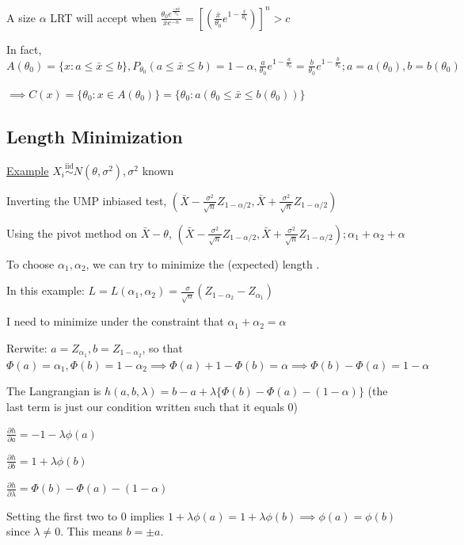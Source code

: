 \documentclass{article}
\newcommand{\iiddist}{\overset{\mathrm{iid}}{\sim}}
\begin{document}
A size $\alpha$ LRT will accept when $\frac{\theta_0 e^{\frac{-n\bar{x}}{\theta_0}}}{\bar{x} e^{-n}} = \left[(\frac{\bar{x}}{\theta_0}e^{1-\frac{\bar{x}}{\theta_0}})\right]^n > c$

In fact, $A(\theta_0) = \{x: a \le \bar{x} \le b\}, P_{\theta_0}(a \le \bar{x} \le b) = 1-\alpha, \frac{a}{\theta_0} e^{1-\frac{a}{\theta_0}} = \frac{b}{\theta_0}e^{1-\frac{b}{\theta_0}}; a = a(\theta_0), b = b(\theta_0)$

$\implies C(x) = \{\theta_0: x \in A(\theta_0)\} = \{\theta_0: a(\theta_0 \le \bar{x} \le b(\theta_0))\}$

\subsection{Length Minimization}

\underline{Example} $X_i \iiddist N(\theta, \sigma^2), \sigma^2$ known

Inverting the UMP inbiased test, $(\bar{X} - \frac{\sigma^2}{\sqrt{n}}Z_{1-\alpha/2}, \bar{X} + \frac{\sigma^2}{\sqrt{n}}Z_{1-\alpha/2})$

Using the pivot method on $\bar{X} - \theta$, $(\bar{X} - \frac{\sigma^2}{\sqrt{n}}Z_{1-\alpha/2}, \bar{X} + \frac{\sigma^2}{\sqrt{n}}Z_{1-\alpha/2}); \alpha_1 + \alpha_2 + \alpha$

To choose $\alpha_1, \alpha_2$, we can try to minimize the (expected) length .

In this example: $L = L(\alpha_1, \alpha_2) = \frac{\sigma}{\sqrt{n}}(Z_{1-\alpha_2} - Z_{\alpha_1})$

I need to minimize under the constraint that $\alpha_1 + \alpha_2 = \alpha$

Rerwite: $a = Z_{\alpha_1}, b = Z_{1-\alpha_2}$, so that $\Phi(a) = \alpha_1, \Phi(b) = 1-\alpha_2 \implies \Phi(a) + 1 - \Phi(b) = \alpha \implies \Phi(b) - \Phi(a) = 1-\alpha$

The Langrangian is $h(a,b,\lambda) = b-a + \lambda\{\Phi(b) - \Phi(a) - (1-\alpha)\}$ (the last term is just our condition written such that it equals 0)

$\frac{\partial h}{\partial a} = -1 - \lambda \phi(a)$

$\frac{\partial h}{\partial b} = 1 + \lambda \phi(b)$

$\frac{\partial h}{\partial \lambda} = \Phi(b) - \Phi(a) - (1-\alpha)$

Setting the first two to 0 implies $1+\lambda \phi(a) = 1 + \lambda \phi(b) \implies \phi(a) = \phi(b)$ since $\lambda \neq 0$. This means $b = \pm a$.
\end{document}
